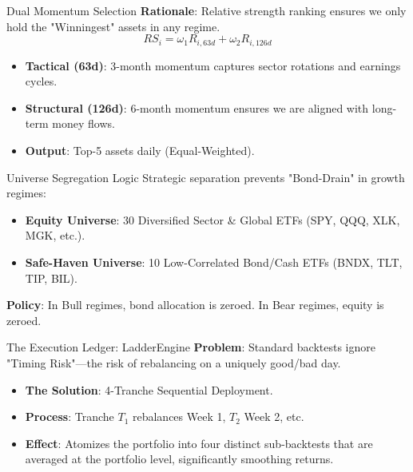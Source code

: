 \documentclass[10pt]{beamer}
\begin{document}
\begin{frame}{Dual Momentum Selection}
    \textbf{Rationale}: Relative strength ranking ensures we only hold the "Winningest" assets in any regime.
    \vspace{0.4cm}
    \[ RS_i = \omega_1 R_{i, 63d} + \omega_2 R_{i, 126d} \]
    \vspace{0.3cm}
    \begin{itemize}
        \item \textbf{Tactical (63d)}: 3-month momentum captures sector rotations and earnings cycles.
        \item \textbf{Structural (126d)}: 6-month momentum ensures we are aligned with long-term money flows.
        \item \textbf{Output}: Top-5 assets daily (Equal-Weighted).
    \end{itemize}
\end{frame}

\begin{frame}{Universe Segregation Logic}
    Strategic separation prevents "Bond-Drain" in growth regimes:
    \vspace{0.3cm}
    \begin{itemize}
        \item \textbf{Equity Universe}: 30 Diversified Sector \& Global ETFs (SPY, QQQ, XLK, MGK, etc.).
        \item \textbf{Safe-Haven Universe}: 10 Low-Correlated Bond/Cash ETFs (BNDX, TLT, TIP, BIL).
    \end{itemize}
    \vspace{0.3cm}
    \textbf{Policy}: In Bull regimes, bond allocation is zeroed. In Bear regimes, equity is zeroed.
\end{frame}

\begin{frame}{The Execution Ledger: LadderEngine}
    \textbf{Problem}: Standard backtests ignore "Timing Risk"—the risk of rebalancing on a uniquely good/bad day.
    \vspace{0.3cm}
    \begin{itemize}
        \item \textbf{The Solution}: 4-Tranche Sequential Deployment.
        \item \textbf{Process}: Tranche $T_1$ rebalances Week 1, $T_2$ Week 2, etc.
        \item \textbf{Effect}: Atomizes the portfolio into four distinct sub-backtests that are averaged at the portfolio level, significantly smoothing returns.
    \end{itemize}
\end{frame}
\end{document}
